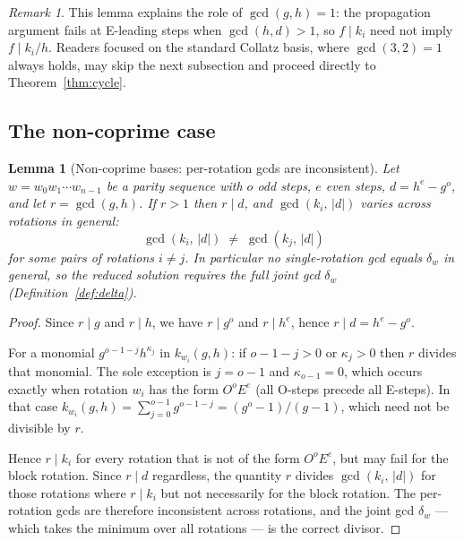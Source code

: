 \documentclass[12pt]{article}
\newtheorem{lemma}[theorem]{Lemma}
\theoremstyle{definition}
\theoremstyle{remark}
\newtheorem{remark}[theorem]{Remark}
\newcommand{\kpoly}{k}
\begin{document}
\begin{remark}
This lemma explains the role of $\gcd(g,h) = 1$: the propagation argument
fails at E-leading steps when $\gcd(h,d) > 1$, so $f \mid k_i$ need not
imply $f \mid k_i/h$.  Readers focused on the standard Collatz basis, where
$\gcd(3,2) = 1$ always holds, may skip the next subsection and proceed
directly to Theorem~\ref{thm:cycle}.
\end{remark}

\subsection*{The non-coprime case}

\begin{lemma}[Non-coprime bases: per-rotation gcds are inconsistent]
\label{lem:cycle-gcd}
Let $w = w_0 w_1 \cdots w_{n-1}$ be a parity sequence with $o$ odd steps,
$e$ even steps, $d = h^e - g^o$, and let $r = \gcd(g,h)$.  If $r > 1$
then $r \mid d$, and $\gcd(k_i,\,|d|)$ varies across rotations in general:
\[
  \gcd(k_i,\,|d|) \;\neq\; \gcd(k_j,\,|d|)
\]
for some pairs of rotations $i \neq j$.  In particular no single-rotation
gcd equals $\delta_w$ in general, so the reduced solution requires the
full joint gcd $\delta_w$ (Definition~\ref{def:delta}).
\end{lemma}

\begin{proof}
Since $r \mid g$ and $r \mid h$, we have $r \mid g^o$ and $r \mid h^e$,
hence $r \mid d = h^e - g^o$.

For a monomial $g^{o-1-j}h^{\kappa_j}$ in $\kpoly_{w_i}(g,h)$: if
$o - 1 - j > 0$ or $\kappa_j > 0$ then $r$ divides that monomial.  The
sole exception is $j = o-1$ and $\kappa_{o-1} = 0$, which occurs exactly
when rotation $w_i$ has the form $O^o E^e$ (all O-steps precede all
E-steps).  In that case $\kpoly_{w_i}(g,h) = \sum_{j=0}^{o-1} g^{o-1-j}
= (g^o - 1)/(g-1)$, which need not be divisible by $r$.

Hence $r \mid k_i$ for every rotation that is not of the form $O^o E^e$,
but may fail for the block rotation.  Since $r \mid d$ regardless, the
quantity $r$ divides $\gcd(k_i,\,|d|)$ for those rotations where $r \mid k_i$
but not necessarily for the block rotation.  The per-rotation gcds are
therefore inconsistent across rotations, and the joint gcd $\delta_w$
— which takes the minimum over all rotations — is the correct divisor.
\end{proof}
\end{document}
